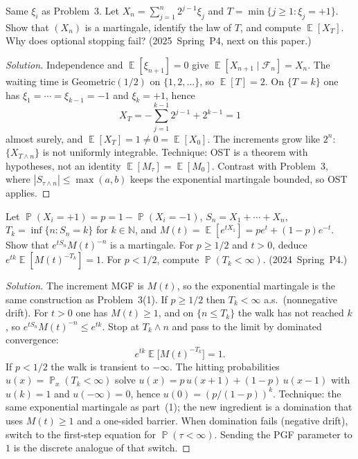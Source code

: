 \documentclass[11pt,a4paper]{article}
\DeclareMathOperator{\E}{\mathbb{E}}
\DeclareMathOperator{\Pbb}{\mathbb{P}}
\begin{document}
\begin{example}
\label{ex:stop-ost-fails}
Same \( \xi_i \) as Problem~3. Let \( X_n=\sum_{j=1}^{n}2^{j-1}\xi_j \) and \( T=\min\{j\ge 1:\xi_j=+1\} \). Show that \( (X_n) \) is a martingale, identify the law of \( T \), and compute \( \E[X_T] \). Why does optional stopping fail? (2025~Spring~P4, next on this paper.)
\end{example}

\begin{proof}[Solution]
Independence and \( \E[\xi_{n+1}]=0 \) give \( \E[X_{n+1}\mid\mathcal{F}_n]=X_n \). The waiting time is Geometric\( (1/2) \) on \( \{1,2,\dots\} \), so \( \E[T]=2 \). On \( \{T=k\} \) one has \( \xi_1=\cdots=\xi_{k-1}=-1 \) and \( \xi_k=+1 \), hence
\[
X_T
=
-\sum_{j=1}^{k-1}2^{j-1}+2^{k-1}
=
1
\]
almost surely, and \( \E[X_T]=1\neq 0=\E[X_0] \). The increments grow like \( 2^{n} \): \( \{X_{T\wedge n}\} \) is not uniformly integrable. Technique: OST is a theorem with hypotheses, not an identity \( \E[M_{\tau}]=\E[M_0] \). Contrast with Problem~3, where \( |S_{\tau\wedge n}|\le\max(a,b) \) keeps the exponential martingale bounded, so OST applies.
\end{proof}

\begin{example}
\label{ex:stop-asymmetric}
Let \( \Pbb(X_i=+1)=p=1-\Pbb(X_i=-1) \), \( S_n=X_1+\cdots+X_n \), \( T_k=\inf\{n:S_n=k\} \) for \( k\in\mathbb{N} \), and \( M(t)=\E[e^{tX_1}]=pe^{t}+(1-p)e^{-t} \). Show that \( e^{tS_n}M(t)^{-n} \) is a martingale. For \( p\ge 1/2 \) and \( t>0 \), deduce \( e^{tk}\E[M(t)^{-T_k}]=1 \). For \( p<1/2 \), compute \( \Pbb(T_k<\infty) \). (2024~Spring~P4.)
\end{example}

\begin{proof}[Solution]
The increment MGF is \( M(t) \), so the exponential martingale is the same construction as Problem~3(1). If \( p\ge 1/2 \) then \( T_k<\infty \) a.s.\ (nonnegative drift). For \( t>0 \) one has \( M(t)\ge 1 \), and on \( \{n\le T_k\} \) the walk has not reached \( k \), so \( e^{tS_n}M(t)^{-n}\le e^{tk} \). Stop at \( T_k\wedge n \) and pass to the limit by dominated convergence:
\[
e^{tk}\E\bigl[M(t)^{-T_k}\bigr]
=
1.
\]
If \( p<1/2 \) the walk is transient to \( -\infty \). The hitting probabilities \( u(x)=\Pbb_x(T_k<\infty) \) solve \( u(x)=p\,u(x+1)+(1-p)\,u(x-1) \) with \( u(k)=1 \) and \( u(-\infty)=0 \), hence \( u(0)=(p/(1-p))^{k} \). Technique: the same exponential martingale as part~(1); the new ingredient is a domination that uses \( M(t)\ge 1 \) and a one-sided barrier. When domination fails (negative drift), switch to the first-step equation for \( \Pbb(\tau<\infty) \). Sending the PGF parameter to \( 1 \) is the discrete analogue of that switch.
\end{proof}
\end{document}

